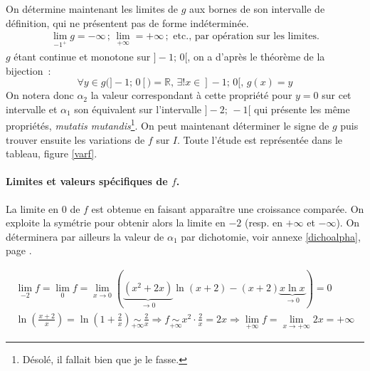 \documentclass{article}
\begin{document}
  On détermine maintenant les limites de $g$ aux bornes de son intervalle de définition, qui ne présentent pas de forme indéterminée.
  \begin{align*}
    \lim_{-1^+} g = -\infty\,;\,\lim_{+\infty} = +\infty\,; \text{ etc., par opération sur les limites.}
  \end{align*}
  $g$ étant continue et monotone sur $]-1;\, 0[$, on a d'après le théorème de la bijection~:
  \begin{displaymath}
    \forall y\in g(]-1;\, 0[) = \mathbb{R},\, \exists! x\in]-1;\, 0[,\, g(x) = y
  \end{displaymath}
  On notera donc $\alpha_2$ la valeur correspondant à cette propriété pour $y = 0$ sur cet intervalle et $\alpha_1$ son équivalent sur l'intervalle $]-2;\, -1[$ qui présente les même propriétés, \textit{mutatis mutandis}\footnote{Désolé, il fallait bien que je le fasse.}. On peut maintenant déterminer le signe de $g$ puis trouver ensuite les variations de $f$ sur $I$. Toute l'étude est représentée dans le tableau, figure \ref{varf}.

  \paragraph{Limites et valeurs spécifiques de $f$.} La limite en 0 de $f$ est obtenue en faisant apparaître une croissance comparée. On exploite la symétrie pour obtenir alors la limite en $-2$ (resp. en $+\infty$ et $-\infty$). On déterminera par ailleurs la valeur de $\alpha_1$ par dichotomie, voir annexe \ref{dichoalpha}, page \pageref{dichoalpha}.

  \begin{align*}
    \lim_{-2} f = \lim_{0} f = \lim_{x\to 0} \left(\underbrace{(x^2 + 2x)}_{\to 0}\ln(x + 2) - (x + 2)\underbrace{x\ln x}_{\to 0}\right) = 0 \\
    \ln\left(\frac{x + 2}{x}\right) = \ln\left(1 + \frac{2}{x}\right) \underset{+\infty}{\sim} \frac{2}{x}
    \Longrightarrow f \underset{+\infty}{\sim} x^2\cdot \frac{2}{x} = 2x \Longrightarrow \lim_{+\infty} f = \lim_{x\to+\infty} 2x = +\infty
  \end{align*}
\end{document}
